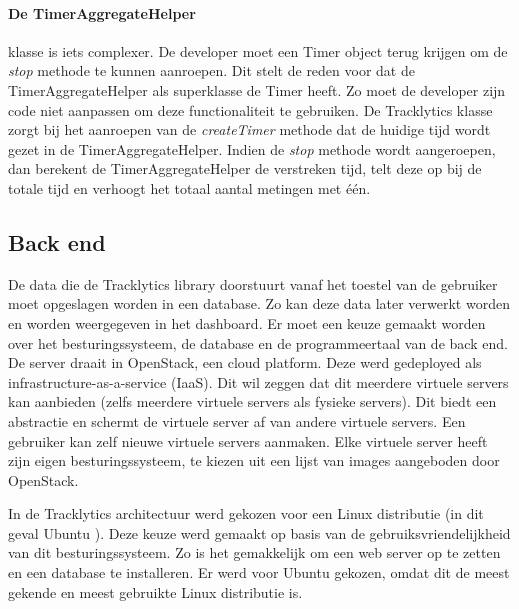 \paragraph{De TimerAggregateHelper} klasse is iets complexer. De developer moet een Timer object terug krijgen om de \textit{stop} methode te kunnen aanroepen. Dit stelt de reden voor dat de TimerAggregateHelper als superklasse de Timer heeft. Zo moet de developer zijn code niet aanpassen om deze functionaliteit te gebruiken. De Tracklytics klasse zorgt bij het aanroepen van de \textit{createTimer} methode dat de huidige tijd wordt gezet in de TimerAggregateHelper. Indien de \textit{stop} methode wordt aangeroepen, dan berekent de TimerAggregateHelper de verstreken tijd, telt deze op bij de totale tijd en verhoogt het totaal aantal metingen met \'e\'en.



\subsection{Back end}
De data die de Tracklytics library doorstuurt vanaf het toestel van de gebruiker moet opgeslagen worden in een database. Zo kan deze data later verwerkt worden en worden weergegeven in het dashboard. Er moet een keuze gemaakt worden over het besturingssysteem, de database en de programmeertaal van de back end.\\

De server draait in OpenStack, een cloud platform. Deze werd gedeployed als infrastructure-as-a-service (IaaS). Dit wil zeggen dat dit meerdere virtuele servers kan aanbieden (zelfs meerdere virtuele servers als fysieke servers). Dit biedt een abstractie en schermt de virtuele server af van andere virtuele servers. Een gebruiker kan zelf nieuwe virtuele servers aanmaken. Elke virtuele server heeft zijn eigen besturingssysteem, te kiezen uit een lijst van images aangeboden door OpenStack\cite{OpenStack}.

In de Tracklytics architectuur werd gekozen voor een Linux distributie (in dit geval Ubuntu \cite{Ubuntu}). Deze keuze werd gemaakt op basis van de gebruiksvriendelijkheid van dit besturingssysteem. Zo is het gemakkelijk om een web server op te zetten en een database te installeren. Er werd voor Ubuntu gekozen, omdat dit de meest gekende en meest gebruikte Linux distributie is. \\

